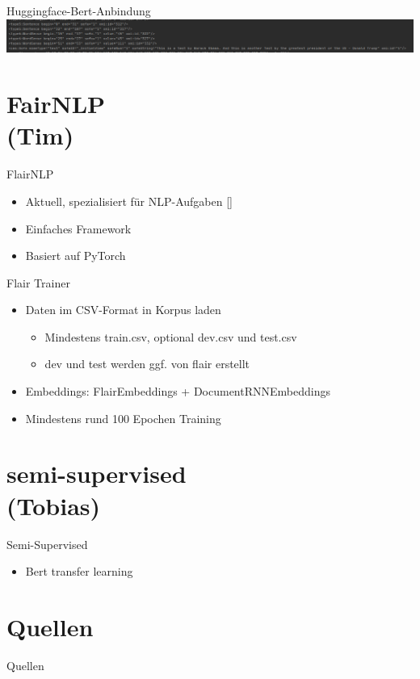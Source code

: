 \documentclass[xcolor=table]{beamer}
\begin{document}
\begin{frame}[t]{Huggingface-Bert-Anbindung}\vspace{10pt}
	\hspace*{-1cm}
	\includegraphics[scale=.25]{einbindung.png}	
\end{frame}


\section{FairNLP\\(Tim)}
\begin{frame}[t]{FlairNLP}\vspace{10pt}
\begin{itemize}
\item Aktuell, spezialisiert für NLP-Aufgaben [\cite{flair}]
\item Einfaches Framework
\item Basiert auf PyTorch
\end{itemize}
\end{frame}

\begin{frame}[t]{Flair Trainer}\vspace{10pt}
\begin{itemize}
\item Daten im CSV-Format in Korpus laden
\begin{itemize}
\item Mindestens train.csv, optional dev.csv und test.csv
\item dev und test werden ggf. von flair erstellt
\end{itemize}
\item Embeddings: FlairEmbeddings + DocumentRNNEmbeddings
\item Mindestens rund 100 Epochen Training
\end{itemize}
\end{frame}

\section{semi-supervised\\(Tobias)}
\begin{frame}[t]{Semi-Supervised}\vspace{10pt}
\begin{itemize}
\item Bert transfer learning
\end{itemize}
\end{frame}

\section{Quellen}
\begin{frame}{Quellen}
\printbibliography
\end{frame}
\end{document}
